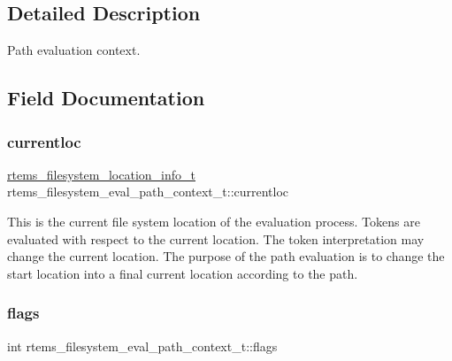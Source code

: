 \subsection{Detailed Description}
Path evaluation context. 

\subsection{Field Documentation}
\mbox{\label{structrtems__filesystem__eval__path__context__t_a0a2e1116817b8255eadbb2e151e6e19a}} 
\subsubsection{\texorpdfstring{currentloc}{currentloc}}
{\footnotesize\ttfamily \mbox{\hyperlink{group__LibIO_ga3252b3d31ee3c49ffff0b7604a676864}{rtems\+\_\+filesystem\+\_\+location\+\_\+info\+\_\+t}} rtems\+\_\+filesystem\+\_\+eval\+\_\+path\+\_\+context\+\_\+t\+::currentloc}

This is the current file system location of the evaluation process. Tokens are evaluated with respect to the current location. The token interpretation may change the current location. The purpose of the path evaluation is to change the start location into a final current location according to the path. \mbox{\label{structrtems__filesystem__eval__path__context__t_ad21e2cded14e7609d73014c7dd25d058}} 
\subsubsection{\texorpdfstring{flags}{flags}}
{\footnotesize\ttfamily int rtems\+\_\+filesystem\+\_\+eval\+\_\+path\+\_\+context\+\_\+t\+::flags}

